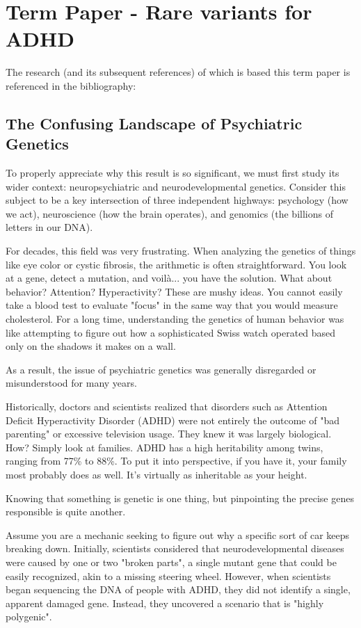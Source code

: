 \chapter{Term Paper - Rare variants for ADHD}  

The research (and its subsequent references) of which is based this term paper is referenced in the bibliography: \cite{demontis2026rare}

\section{The Confusing Landscape of Psychiatric Genetics}  

To properly appreciate why this result is so significant, we must first study its wider context: neuropsychiatric and neurodevelopmental genetics.  Consider this subject to be a key intersection of three independent highways: psychology (how we act), neuroscience (how the brain operates), and genomics (the billions of letters in our DNA).  

For decades, this field was very frustrating.  When analyzing the genetics of things like eye color or cystic fibrosis, the arithmetic is often straightforward.  You look at a gene, detect a mutation, and voilà...  you have the solution. 
What about behavior?  Attention?  Hyperactivity?  These are mushy ideas.  You cannot easily take a blood test to evaluate "focus" in the same way that you would measure cholesterol.  For a long time, understanding the genetics of human behavior was like attempting to figure out how a sophisticated Swiss watch operated based only on the shadows it makes on a wall.  

As a result, the issue of psychiatric genetics was generally disregarded or misunderstood for many years.  

Historically, doctors and scientists realized that disorders such as Attention Deficit Hyperactivity Disorder (ADHD) were not entirely the outcome of "bad parenting" or excessive television usage.  They knew it was largely biological.  How?  Simply look at families. 
ADHD has a high heritability among twins, ranging from 77\% to 88\%.  To put it into perspective, if you have it, your family most probably does as well.  It's virtually as inheritable as your height.  

Knowing that something is genetic is one thing, but pinpointing the precise genes responsible is quite another.  

Assume you are a mechanic seeking to figure out why a specific sort of car keeps breaking down.  Initially, scientists considered that neurodevelopmental diseases were caused by one or two "broken parts", a single mutant gene that could be easily recognized, akin to a missing steering wheel. 
However, when scientists began sequencing the DNA of people with ADHD, they did not identify a single, apparent damaged gene.  Instead, they uncovered a scenario that is "highly polygenic".  

